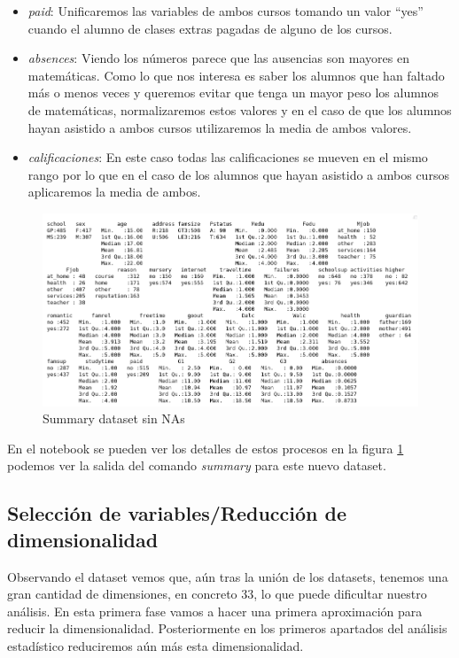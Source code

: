 \documentclass[12pt,a4paper]{article}
\begin{document}
\begin{itemize}
	\item \textit{paid}: Unificaremos las variables de ambos cursos tomando un valor ``yes'' cuando el alumno de clases extras pagadas de alguno de los cursos. 
	\item \textit{absences}: Viendo los números parece que las ausencias son mayores en matemáticas. Como lo que nos interesa es saber los alumnos que han faltado más o menos veces y queremos evitar que tenga un mayor peso los alumnos de matemáticas, normalizaremos estos valores y en el caso de que los alumnos hayan asistido a ambos cursos utilizaremos la media de ambos valores.
	 \item \textit{calificaciones}: En este caso todas las calificaciones se mueven en el mismo rango por lo que en el caso de los alumnos que hayan asistido a ambos cursos aplicaremos la media de ambos. 
\end{itemize}
 \begin{figure}[ht!]
	\centering
	\includegraphics[trim = 0mm 0mm 0mm 0mm, clip,scale=0.4]{images/summary_nonas}
	\caption{Summary dataset sin NAs}
	\label{fig:sum2}
\end{figure}



En el notebook se pueden ver los detalles de estos procesos en la figura \ref{fig:sum2} podemos ver la salida del comando \textit{summary} para este nuevo dataset.



\subsection{Selección de variables/Reducción de dimensionalidad}
Observando el dataset vemos que, aún tras la unión de los datasets, tenemos una gran cantidad de dimensiones, en concreto 33, lo que puede dificultar nuestro análisis. En esta primera fase vamos a hacer una primera aproximación para reducir la dimensionalidad. Posteriormente en los primeros apartados del análisis estadístico reduciremos aún más esta dimensionalidad.
\end{document}
